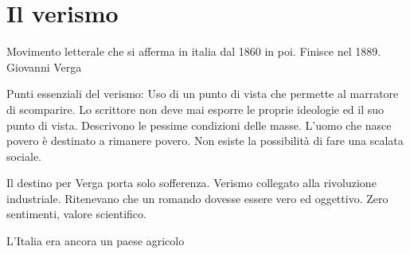 \documentclass{article}
\begin{document}
    \section{Il verismo}
    Movimento letterale che si afferma in italia dal 1860 in poi. Finisce nel 1889.
    Giovanni Verga

    Punti essenziali del verismo:
    Uso di un punto di vista che permette al marratore di scomparire. Lo scrittore non deve mai esporre le proprie ideologie ed
    il suo punto di vista. Descrivono le pessime condizioni delle masse. L'uomo che nasce povero è destinato a rimanere
    povero. Non esiste la possibilità di fare una scalata sociale.

    Il destino per Verga porta solo sofferenza.
    Verismo collegato alla rivoluzione industriale.
    Ritenevano che un romando dovesse essere vero ed oggettivo.
    Zero sentimenti, valore scientifico.

    L'Italia era ancora un paese agricolo
\end{document}
